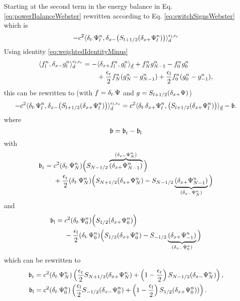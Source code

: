Starting at the second term in the energy balance in Eq. \eqref{eq:powerBalanceWebster} rewritten according to Eq. \eqref{eq:switchSignsWebster} which is
\begin{equation}
    - c^2\langle\delta_{t\cdot}\Psi_l^n, \delta_{x-}\big(S_{l+1/2}(\delta_{x+}\Psi_l^n)\big)\rangle_d^{\epsilon_\text{l},\epsilon_\text{r}}
\end{equation}
Using identity \eqref{eq:weightedIdentityMinus}
\begin{equation*}
    \begin{aligned}
    \langle f_l^n, \delta_{x-} g_l^n \rangle_d^{\epsilon_\text{l},\epsilon_\text{r}}  = -&\langle \delta_{x+} f_l^n, g_l^n \rangle_{\underline{d}}+ f_N^ng_{N-1}^n - f_0^ng_0^n \\
    &+ \frac{\epsilon_\text{r}}{2}f_N^n(g_N^n-g_{N-1}^n)+ \frac{\epsilon_\text{l}}{2}f_0^n(g_0^n - g_{-1}^n),
    \end{aligned}
\end{equation*}
this can be rewritten to (with $f=\delta_{t\cdot}\Psi$ and $g = S_{l+1/2}(\delta_{x+}\Psi)$)
\begin{equation*}
        -c^2\langle \delta_{t\cdot}\Psi_l^n,\delta_{x-} \big(S_{l+1/2}(\delta_{x+}\Psi_l^n)\big) \rangle_{d}^{\epsilon_\text{l},\epsilon_\text{r}} = c^2\langle \delta_{t\cdot}\delta_{x+} \Psi_l^n, \big(S_{l+1/2}(\delta_{x+}\Psi_l^n)\big)\rangle_{\underline{d}} - \mathfrak{b}.
\end{equation*}
where
\begin{equation}
    \mathfrak{b} = \mathfrak{b}_\text{r} - \mathfrak{b}_\text{l}
\end{equation}
with
\begin{equation*}
    \mathfrak{b}_\text{r} =  \begin{aligned}[t]
        &c^2 (\delta_{t\cdot}\Psi_N^n)\Big(S_{N-1/2}\overbrace{(\delta_{x+}\Psi_{N-1}^n)}^{(\delta_{x-}\Psi_{N}^n)}\Big)\\
        &+ \frac{\epsilon_\text{r}}{2}(\delta_{t\cdot}\Psi_{N}^n)\Big(S_{N+1/2}(\delta_{x+}\Psi_N^n)- S_{N-1/2}\underbrace{(\delta_{x+} \Psi_{N-1}^n)}_{(\delta_{x-}\Psi_{N}^n)}\Big)
    \end{aligned}
\end{equation*}
and 
\begin{equation*}
    \mathfrak{b}_\text{l} = \begin{aligned}[t]
        &c^2(\delta_{t\cdot}\Psi_0^n)\Big(S_{1/2}(\delta_{x+}\Psi_0^n)\Big)\\
        & -\frac{\epsilon_\text{l}}{2}(\delta_{t\cdot}\Psi_0^n)\Big(S_{1/2}(\delta_{x+}\Psi_0^n)-S_{-1/2}\underbrace{(\delta_{x+}\Psi_{-1}^n)}_{(\delta_{x-}\Psi_0^n)}\Big)
    \end{aligned}
\end{equation*}
which can be rewritten to
\begin{align}
    \mathfrak{b}_\text{r} &= c^2(\delta_{t\cdot}\Psi_N^n)\left(\frac{\epsilon_\text{r}}{2}S_{N+1/2}(\delta_{x+} \Psi_N^n) + \left(1-\frac{\epsilon_\text{r}}{2}\right)S_{N-1/2}(\delta_{x-}\Psi_N^n)\right),\\
    \mathfrak{b}_\text{l} &= c^2(\delta_{t\cdot}\Psi_0^n)\left(\frac{\epsilon_\text{l}}{2}S_{-1/2}(\delta_{x-}\Psi_0^n)+\left(1-\frac{\epsilon_\text{l}}{2}\right)S_{1/2}(\delta_{x+} \Psi_0^n))\right).
\end{align}

